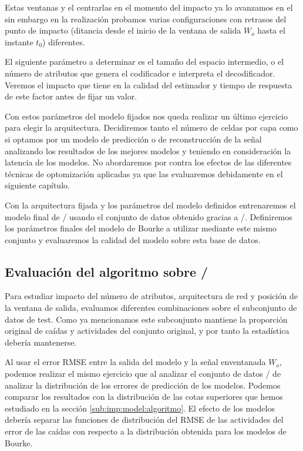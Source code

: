   Estas ventanas y el centrarlas en el momento del impacto ya lo avanzamos en el  sin embargo en la realización probamos varias configuraciones con retrasos del punto de impacto (ditancia desde el inicio de la ventana de salida $W_o$ hasta el instante $t_0$) diferentes. 

  El siguiente parámetro a determinar es el tamaño del espacio intermedio, o el número de atributos que genera el codificador e interpreta el decodificador. Veremos el impacto que tiene en la calidad del estimador y tiempo de respuesta de este factor antes de fijar un valor.

  Con estos parámetros del modelo fijados nos queda realizar un último ejercicio para elegir la arquitectura. Decidiremos tanto el número de celdas por capa como si optamos por un modelo de predicción o de reconstrucción de la señal analizando los resultados de los mejores modelos y teniendo en consideración la latencia de los modelos. No abordaremos por contra los efectos de las diferentes técnicas de optomización aplicadas ya que las evaluaremos debidamente en el siguiente capítulo.

  Con la arquitectura fijada y los parámetros del modelo definidos entrenaremos el modelo final de \ifell/ usando el conjunto de datos obtenido gracias a \accelcapture/. Definiremos los parámetros finales del modelo de Bourke a utilizar mediante este mismo conjunto y evaluaremos la calidad del modelo sobre esta base de datos.

\subsection{Evaluación del algoritmo sobre \ifell/}

Para estudiar impacto del número de atributos, arquitectura de red y posición de la ventana de salida, evaluamos diferentes combinaciones sobre el subconjunto de datos de test. Como ya mencionamos este subconjunto mantiene la proporción original de caídas y actividades del conjunto original, y por tanto la estadística debería mantenerse. 

Al usar el error RMSE entre la salida del modelo y la señal enventanada $W_o$, podemos realizar el mismo ejercicio que al analizar el conjunto de datos \ifell/ de analizar la distribución de los errores de predicción de los modelos. Podemos comparar los resultados con la distribución de las cotas superiores que hemos estudiado en la sección \ref{sub:imp:model:algoritmo}. El efecto de los modelos debería separar las funciones de distribución del RMSE de las actividades del error de las caídas con respecto a la distribución obtenida para los modelos de Bourke.

